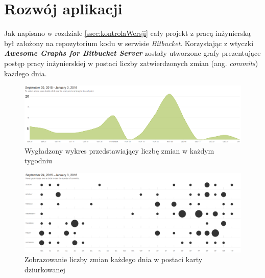 \section{Rozwój aplikacji}
Jak napisano w rozdziale \ref{ssec:kontrolaWersji} cały projekt z pracą inżynierską był założony na repozytorium kodu w serwisie \textit{Bitbucket}. Korzystając z wtyczki \textit{\textbf{Awesome Graphs for Bitbucket Server}} zostały utworzone grafy prezentujące postęp pracy inżynierskiej w postaci liczby zatwierdzonych zmian (ang. \emph{commits}) każdego dnia.
\begin{figure}[h]
	\centering
	\includegraphics[width=\textwidth]{./img/wykres1}
	\caption{Wygładzony wykres przedstawiający liczbę zmian w każdym tygodniu}
\end{figure}
\begin{figure}[h]
	\centering
	\includegraphics[width=\textwidth]{./img/wykres2}
	\caption{Zobrazowanie liczby zmian każdego dnia w postaci karty dziurkowanej}
\end{figure}